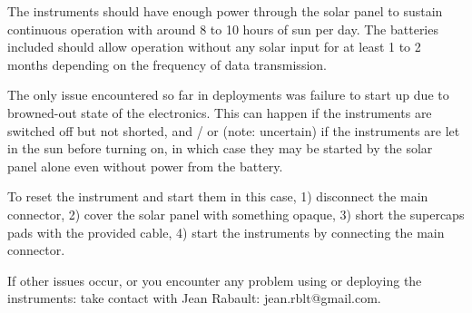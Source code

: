 \documentclass[pdftex,a4paper,12pt,twocolumn,fleqn,captions=tableheading]{scrartcl}
\begin{document}
The instruments should have enough power through the solar panel to sustain continuous operation with around 8 to 10 hours of sun per day. The batteries included should allow operation without any solar input for at least 1 to 2 months depending on the frequency of data transmission.

The only issue encountered so far in deployments was failure to start up due to browned-out state of the electronics. This can happen if the instruments are switched off but not shorted, and / or (note: uncertain) if the instruments are let in the sun before turning on, in which case they may be started by the solar panel alone even without power from the battery.

To reset the instrument and start them in this case, 1) disconnect the main connector, 2) cover the solar panel with something opaque, 3) short the supercaps pads with the provided cable, 4) start the instruments by connecting the main connector.

If other issues occur, or you encounter any problem using or deploying the instruments: take contact with Jean Rabault: jean.rblt@gmail.com.
\end{document}
